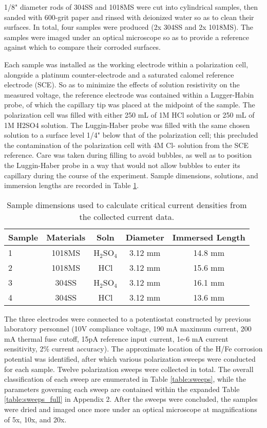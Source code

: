 1/8" diameter rods of 304SS and 1018MS were cut into cylindrical samples, then sanded with 600-grit paper and rinsed with deionized water so as to clean their surfaces.  In total, four samples were produced (2x 304SS and 2x 1018MS).  The samples were imaged under an optical microscope so as to provide a reference against which to compare their corroded surfaces.

Each sample was installed as the working electrode within a polarization cell, alongside a platinum counter-electrode and a saturated calomel reference electrode (SCE).  So as to minimize the effects of solution resistivity on the measured voltage, the reference electrode was contained within a Lugger-Habin probe, of which the capillary tip was placed at the midpoint of the sample.  The polarization cell was filled with either 250 mL of 1M HCl solution or 250 mL of 1M H2SO4 solution.  The Luggin-Haber probe was filled with the same chosen solution to a surface level 1/4" below that of the polarization cell; this precluded the contamination of the polarization cell with 4M Cl- solution from the SCE reference.  Care was taken during filling to avoid bubbles, as well as to position the Luggin-Haber probe in a way that would not allow bubbles to enter its capillary during the course of the experiment.  Sample dimensions, solutions, and immersion lengths are recorded in Table \ref{table:samples}.

\begin{table}[h!]
	\centering
	\begin{tabular}{lcccc}
	\toprule
	Sample & Materials & Soln & Diameter & Immersed Length \\
	\midrule
	1 & 1018MS & H$_2$SO$_4$ & 3.12 mm & 14.8 mm \\
	2 & 1018MS & HCl	 & 3.12 mm & 15.6 mm \\
	3 & 304SS  & H$_2$SO$_4$ & 3.12 mm & 16.1 mm \\
	4 & 304SS  & HCl	 & 3.12 mm & 13.6 mm \\
	\bottomrule
	\end{tabular}
	\caption{Sample dimensions used to calculate critical current densities from the collected current data.}
	\label{table:samples}
\end{table}

The three electrodes were connected to a potentiostat constructed by previous laboratory personnel (10V compliance voltage, 190 mA maximum current, 200 mA thermal fuse cutoff, 15pA reference input current, 1e-6 mA current sensitivity, 2\% current accuracy).  The approximate location of the H/Fe corrosion potential was identified, after which various polarization sweeps were conducted for each sample.  Twelve polarization sweeps were collected in total.  The overall classification of each sweep are enumerated in Table \ref{table:sweeps}, while the parameters governing each sweep are contained within the expanded Table \ref{table:sweeps_full} in Appendix 2.  After the sweeps were concluded, the samples were dried and imaged once more under an optical microscope at magnifications of 5x, 10x, and 20x.

